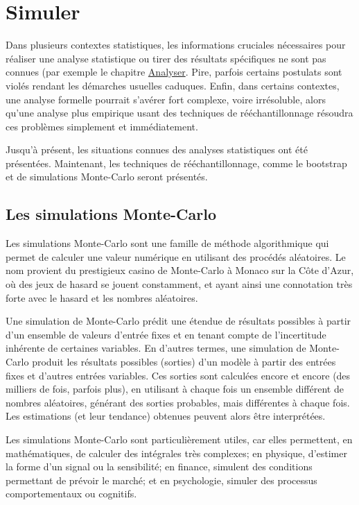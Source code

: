 \documentclass[
]{book}
\begin{document}
\hypertarget{simuler}{%
\chapter{Simuler}\label{simuler}}

Dans plusieurs contextes statistiques, les informations cruciales nécessaires pour réaliser une analyse statistique ou tirer des résultats spécifiques ne sont pas connues (par exemple le chapitre \protect\hyperlink{analyser}{Analyser}. Pire, parfois certains postulats sont violés rendant les démarches usuelles caduques. Enfin, dans certains contextes, une analyse formelle pourrait s'avérer fort complexe, voire irrésoluble, alors qu'une analyse plus empirique usant des techniques de rééchantillonnage résoudra ces problèmes simplement et immédiatement.

Jusqu'à présent, les situations connues des analyses statistiques ont été présentées. Maintenant, les techniques de rééchantillonnage, comme le bootstrap et de simulations Monte-Carlo seront présentés.

\hypertarget{les-simulations-monte-carlo}{%
\section{Les simulations Monte-Carlo}\label{les-simulations-monte-carlo}}

Les simulations Monte-Carlo sont une famille de méthode algorithmique qui permet de calculer une valeur numérique en utilisant des procédés aléatoires. Le nom provient du prestigieux casino de Monte-Carlo à Monaco sur la Côte d'Azur, où des jeux de hasard se jouent constamment, et ayant ainsi une connotation très forte avec le hasard et les nombres aléatoires.

Une simulation de Monte-Carlo prédit une étendue de résultats possibles à partir d'un ensemble de valeurs d'entrée fixes et en tenant compte de l'incertitude inhérente de certaines variables. En d'autres termes, une simulation de Monte-Carlo produit les résultats possibles (sorties) d'un modèle à partir des entrées fixes et d'autres entrées variables. Ces sorties sont calculées encore et encore (des milliers de fois, parfois plus), en utilisant à chaque fois un ensemble différent de nombres aléatoires, générant des sorties probables, mais différentes à chaque fois. Les estimations (et leur tendance) obtenues peuvent alors être interprétées.

Les simulations Monte-Carlo sont particulièrement utiles, car elles permettent, en mathématiques, de calculer des intégrales très complexes; en physique, d'estimer la forme d'un signal ou la sensibilité; en finance, simulent des conditions permettant de prévoir le marché; et en psychologie, simuler des processus comportementaux ou cognitifs.
\end{document}
